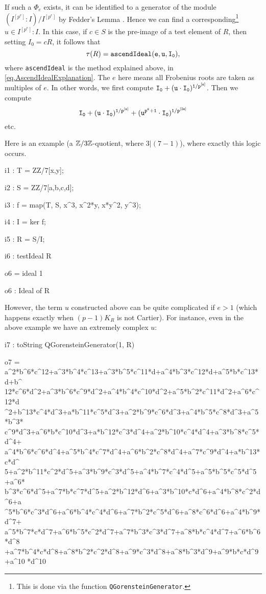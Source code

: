 \documentclass{amsart}
\begin{document}
If such a $\Phi_e$ exists, it can be identified to a generator of the module $(I^{[p^e]} : I) / I^{[p^e]}$ by Fedder's Lemma \cite{FedderFPureRat}.  Hence we can find a corresponding\footnote{This is done via the function \texttt{QGorensteinGenerator}. } $u \in I^{[p^e]} : I$.  In this case, if $c \in S$ is the pre-image of a test element of $R$, then setting $I_0 = cR$, it follows that
\[
\tau(R) = {\tt ascendIdeal(e, u, I_0)},
\]
where \texttt{ascendIdeal} is the method explained above, in \autoref{eq.AscendIdealExplanation}.
The $e$ here means all Frobenius roots are taken as multiples of $e$.  In other words, we first compute ${\tt I_0 +  (u \cdot I_0)^{1/p^{[e]}}}$.  Then we compute
\[
{\tt I_0 +  (u\cdot I_0)^{1/p^{[e]}} + (u^{p^e + 1} \cdot I_0)^{1/p^{[2e]}} }
\]
etc.

Here is an example (a $\mathbb{Z}/3\mathbb{Z}$-quotient, where $3 | (7-1)$), where exactly this logic occurs.

\medskip
{\small{}
\begin{MyVerbatim}
i1 : T = ZZ/7[x,y];

i2 : S = ZZ/7[a,b,c,d];

i3 : f = map(T, S, {x^3, x^2*y, x*y^2, y^3});

i4 : I = ker f;

i5 : R = S/I;

i6 : testIdeal R

o6 = ideal 1

o6 : Ideal of R
\end{MyVerbatim}
}\medskip

However, the term $u$ constructed above can be quite complicated if $e > 1$ (which happens exactly when $(p -1)K_R$ is not Cartier).  For instance, even in the above example we have an extremely complex $u$:

\medskip
{\small{}
\begin{MyVerbatim}
i7 : toString QGorensteinGenerator(1, R)

o7 = a^2*b^6*c^12+a^3*b^4*c^13+a^3*b^5*c^11*d+a^4*b^3*c^12*d+a^5*b*c^13*d+b^
     12*c^6*d^2+a^3*b^6*c^9*d^2+a^4*b^4*c^10*d^2+a^5*b^2*c^11*d^2+a^6*c^12*d
     ^2+b^13*c^4*d^3+a*b^11*c^5*d^3+a^2*b^9*c^6*d^3+a^4*b^5*c^8*d^3+a^5*b^3*
     c^9*d^3+a^6*b*c^10*d^3+a*b^12*c^3*d^4+a^2*b^10*c^4*d^4+a^3*b^8*c^5*d^4+
     a^4*b^6*c^6*d^4+a^5*b^4*c^7*d^4+a^6*b^2*c^8*d^4+a^7*c^9*d^4+a*b^13*c*d^
     5+a^2*b^11*c^2*d^5+a^3*b^9*c^3*d^5+a^4*b^7*c^4*d^5+a^5*b^5*c^5*d^5+a^6*
     b^3*c^6*d^5+a^7*b*c^7*d^5+a^2*b^12*d^6+a^3*b^10*c*d^6+a^4*b^8*c^2*d^6+a
     ^5*b^6*c^3*d^6+a^6*b^4*c^4*d^6+a^7*b^2*c^5*d^6+a^8*c^6*d^6+a^4*b^9*d^7+
     a^5*b^7*c*d^7+a^6*b^5*c^2*d^7+a^7*b^3*c^3*d^7+a^8*b*c^4*d^7+a^6*b^6*d^8
     +a^7*b^4*c*d^8+a^8*b^2*c^2*d^8+a^9*c^3*d^8+a^8*b^3*d^9+a^9*b*c*d^9+a^10
     *d^10
\end{MyVerbatim}
}\medskip
\end{document}

